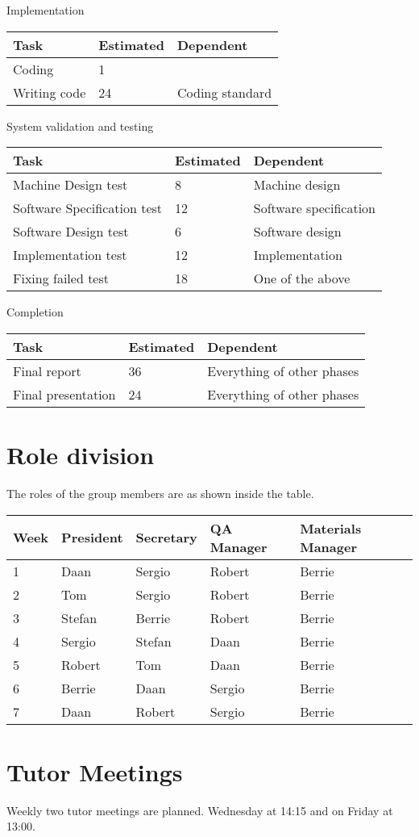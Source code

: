 \documentclass[a4paper,oneside,11pt]{article}
\begin{document}
Implementation
\begin{center}
\begin{tabular}{|l|l|l|}
\hline
Task & Estimated & Dependent\\
\hline
Coding & 1 & \\ \hline
Writing code & 24 & Coding standard\\
\hline
\end{tabular}
\end{center}
System validation and testing
\begin{center}
\begin{tabular}{|l|l|l|}
\hline
Task & Estimated & Dependent\\
\hline
Machine Design test & 8 & Machine design\\ \hline
Software Specification test & 12 & Software specification\\ \hline
Software Design test & 6 & Software design\\ \hline
Implementation test & 12 & Implementation\\ \hline
Fixing failed test & 18 & One of the above\\ 
\hline
\end{tabular}
\end{center}
Completion
\begin{center}
\begin{tabular}{|l|l|l|}
\hline
Task & Estimated & Dependent\\
\hline
Final report & 36 & Everything of other phases\\ \hline
Final presentation & 24 & Everything of other phases\\
\hline
\end{tabular}
\end{center}
\section{Role division}
The roles of the group members are as shown inside the table.\\
\begin{center}
\begin{tabular}{|l|l|l|l|l|}
\hline
Week & President & Secretary & QA Manager & Materials Manager\\
\hline
1 & Daan & Sergio & Robert & Berrie\\
\hline
2 & Tom & Sergio & Robert & Berrie\\
\hline
3 & Stefan & Berrie & Robert & Berrie\\
\hline
4 & Sergio & Stefan & Daan & Berrie\\
\hline
5 & Robert & Tom & Daan & Berrie\\
\hline
6 & Berrie & Daan & Sergio & Berrie\\
\hline
7 & Daan & Robert & Sergio & Berrie\\
\hline
\end{tabular}
\end{center}

\section{Tutor Meetings}
Weekly two tutor meetings are planned. Wednesday at 14:15 and on Friday at 13:00.
\end{document}
